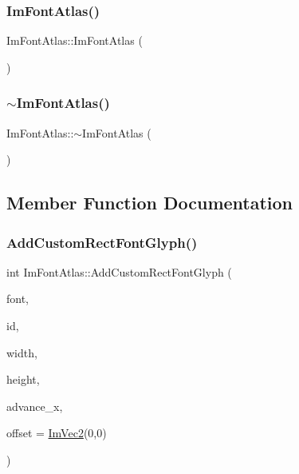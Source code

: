 \subsubsection{\texorpdfstring{Im\+Font\+Atlas()}{ImFontAtlas()}}
{\footnotesize\ttfamily Im\+Font\+Atlas\+::\+Im\+Font\+Atlas (\begin{DoxyParamCaption}{ }\end{DoxyParamCaption})}

\hypertarget{struct_im_font_atlas_a950b4f7586ad7786ae251b957d67a268}{}\label{struct_im_font_atlas_a950b4f7586ad7786ae251b957d67a268} 
\subsubsection{\texorpdfstring{$\sim$\+Im\+Font\+Atlas()}{~ImFontAtlas()}}
{\footnotesize\ttfamily Im\+Font\+Atlas\+::$\sim$\+Im\+Font\+Atlas (\begin{DoxyParamCaption}{ }\end{DoxyParamCaption})}



\subsection{Member Function Documentation}
\hypertarget{struct_im_font_atlas_a5643182be4e3f1a442cfa6cdc0321c7c}{}\label{struct_im_font_atlas_a5643182be4e3f1a442cfa6cdc0321c7c} 
\subsubsection{\texorpdfstring{Add\+Custom\+Rect\+Font\+Glyph()}{AddCustomRectFontGlyph()}}
{\footnotesize\ttfamily int Im\+Font\+Atlas\+::\+Add\+Custom\+Rect\+Font\+Glyph (\begin{DoxyParamCaption}\item[{\hyperlink{struct_im_font}{Im\+Font} $\ast$}]{font,  }\item[{Im\+Wchar}]{id,  }\item[{int}]{width,  }\item[{int}]{height,  }\item[{float}]{advance\+\_\+x,  }\item[{const \hyperlink{struct_im_vec2}{Im\+Vec2} \&}]{offset = {\ttfamily \hyperlink{struct_im_vec2}{Im\+Vec2}(0,0)} }\end{DoxyParamCaption})}

